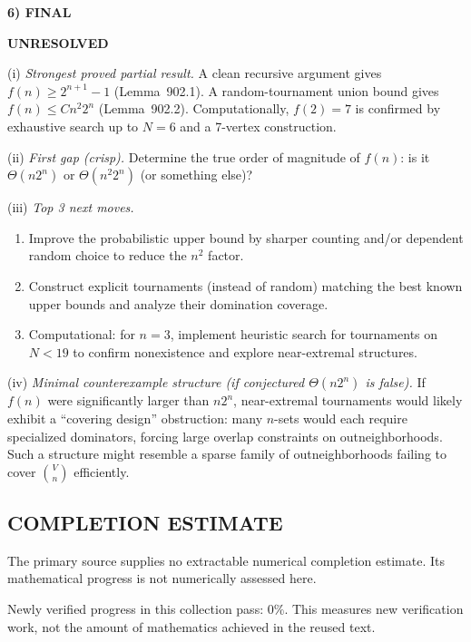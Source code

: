 \medskip
\noindent\textbf{6) FINAL}

\textbf{UNRESOLVED}

(i) \emph{Strongest proved partial result.}
A clean recursive argument gives $f(n)\ge 2^{n+1}-1$ (Lemma~902.1).
A random-tournament union bound gives $f(n)\le C n^2 2^n$ (Lemma~902.2).
Computationally, $f(2)=7$ is confirmed by exhaustive search up to $N=6$ and a
7-vertex construction.

(ii) \emph{First gap (crisp).}
Determine the true order of magnitude of $f(n)$: is it $\Theta(n2^n)$ or
$\Theta(n^2 2^n)$ (or something else)?

(iii) \emph{Top 3 next moves.}
\begin{enumerate}
\item Improve the probabilistic upper bound by sharper counting and/or dependent
random choice to reduce the $n^2$ factor.
\item Construct explicit tournaments (instead of random) matching the best known
upper bounds and analyze their domination coverage.
\item Computational: for $n=3$, implement heuristic search for tournaments on
$N<19$ to confirm nonexistence and explore near-extremal structures.
\end{enumerate}

(iv) \emph{Minimal counterexample structure (if conjectured $\Theta(n2^n)$ is false).}
If $f(n)$ were significantly larger than $n2^n$, near-extremal tournaments would
likely exhibit a “covering design” obstruction: many $n$-sets would each require
specialized dominators, forcing large overlap constraints on outneighborhoods.
Such a structure might resemble a sparse family of outneighborhoods failing to
cover $\binom{V}{n}$ efficiently.


\subsection*{COMPLETION ESTIMATE}
The primary source supplies no extractable numerical completion estimate. Its mathematical progress is not numerically assessed here.

Newly verified progress in this collection pass: $0\%$. This measures new verification work, not the amount of mathematics achieved in the reused text.
